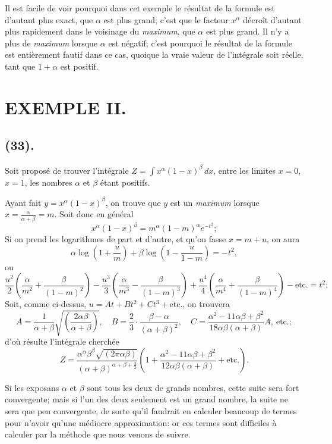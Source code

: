 \documentclass{article}
\begin{document}
Il est facile de voir pourquoi dans cet exemple le résultat de la formule est d'autant plus exact, que $\alpha$ est plus grand; c'est que le facteur $x^{\alpha}$ décroît d'autant plus rapidement dans le voisinage du \emph{maximum}, que $\alpha$ est plus grand. Il n'y a plus de \emph{maximum} lorsque $\alpha$ est négatif; c'est pourquoi le résultat de la formule est entièrement fautif dans ce cas, quoique la vraie valeur de l'intégrale soit réelle, tant que $1+\alpha$ est positif.


\section*{EXEMPLE II.}

\subsection*{(33).}

Soit proposé de trouver l'intégrale $Z=\displaystyle\int x^{\alpha}(1-x)^{\beta}\,dx$, entre les limites $x=0$, $x=1$, les nombres $\alpha$ et $\beta$ étant positifs.

Ayant fait $y=x^{\alpha}(1-x)^{\beta}$, on trouve que $y$ est un \emph{maximum} lorsque $x=\frac{\alpha}{\alpha+\beta}=m$. Soit donc en général
\[ x^{\alpha}(1-x)^{\beta}=m^{\alpha}(1-m)^{\alpha}e^{-t^{2}}; \]
Si on prend les logarithmes de part et d'autre, et qu'on fasse $x=m+u$, on aura
\[ \alpha\log\left(1+\frac{u}{m}\right)+\beta\log\left(1-\frac{u}{1-m}\right)=-t^{2}, \]
ou
\[ \frac{u^{2}}{2}\left(\frac{\alpha}{m^{2}}+\frac{\beta}{(1-m)^{2}}\right)-\frac{u^{3}}{3}\left(\frac{\alpha}{m^{3}}-\frac{\beta}{(1-m)^{3}}\right)+\frac{u^{4}}{4}\left(\frac{\alpha}{m^{4}}+\frac{\beta}{(1-m)^{4}}\right)-\text{etc.}=t^{2}; \]
Soit, comme ci-dessus, $u=At+Bt^{2}+Ct^{3}+\text{etc.}$, on trouvera
\[ A=\frac{1}{\alpha+\beta}\sqrt{\left(\frac{2\alpha\beta}{\alpha+\beta}\right)},\quad B=\frac{2}{3}\cdot\frac{\beta-\alpha}{(\alpha+\beta)^{2}},\quad C=\frac{\alpha^{2}-11\alpha\beta+\beta^{2}}{18\alpha\beta(\alpha+\beta)}A,\ \text{etc.}; \]
d'où résulte l'intégrale cherchée
\[ Z=\frac{\alpha^{\alpha}\beta^{\beta}\sqrt{(2\pi\alpha\beta)}}{(\alpha+\beta)^{\alpha+\beta+\frac{3}{2}}}\left(1+\frac{\alpha^{2}-11\alpha\beta+\beta^{2}}{12\alpha\beta(\alpha+\beta)}+\text{etc.}\right). \]

Si les exposans $\alpha$ et $\beta$ sont tous les deux de grands nombres, cette suite sera fort convergente; mais si l'un des deux seulement est un grand nombre, la suite ne sera que peu convergente, de sorte qu'il faudrait en calculer beaucoup de termes pour n'avoir qu'une médiocre approximation: or ces termes sont difficiles à calculer par la méthode que nous venons de suivre.
\end{document}

